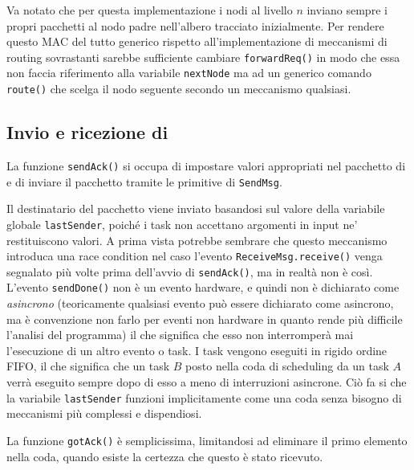 \documentclass[twoside,11pt,a4paper,italian,openany]{book}
\begin{document}
Va notato che per questa implementazione i nodi al livello $n$ inviano sempre i propri 
pacchetti al nodo padre nell'albero tracciato inizialmente. 
Per rendere questo MAC del tutto generico rispetto all'implementazione di meccanismi di 
routing sovrastanti sarebbe sufficiente cambiare \texttt{forwardReq()} in modo che essa 
non faccia riferimento alla variabile  \texttt{nextNode} ma ad un generico comando 
\texttt{route()} che scelga il nodo seguente secondo un meccanismo qualsiasi.  

\subsection{Invio e ricezione di \ack}
La funzione \texttt{sendAck()} si occupa di impostare valori appropriati nel pacchetto di \ack 
e di inviare il pacchetto tramite le primitive di \texttt{SendMsg}. 

Il destinatario del pacchetto \ack viene inviato basandosi sul valore della variabile 
globale \texttt{lastSender}, poiché i task non accettano argomenti in input ne' 
restituiscono valori. 
A prima vista potrebbe sembrare che questo meccanismo introduca una race condition nel 
caso l'evento \texttt{ReceiveMsg.receive()} venga segnalato più volte prima dell'avvio 
di \texttt{sendAck()},
ma in realtà non è così. L'evento \texttt{sendDone()} non è un evento hardware, e quindi non 
è dichiarato come \emph{asincrono} (teoricamente qualsiasi evento può essere dichiarato come asincrono, ma è convenzione non farlo per eventi non hardware in quanto rende più difficile l'analisi del programma) il che significa che esso non interromperà mai l'esecuzione di un altro evento o task. 
I task vengono eseguiti in rigido ordine FIFO, il che significa che un task $B$ posto nella coda
di scheduling da un task $A$ verrà eseguito sempre dopo di esso a meno di interruzioni asincrone.
Ciò fa si che la variabile \texttt{lastSender} funzioni implicitamente come una coda senza 
bisogno di meccanismi più complessi e dispendiosi. 

La funzione \texttt{gotAck()} è semplicissima, limitandosi ad eliminare il primo elemento 
nella coda, quando esiste la certezza che questo è stato ricevuto. 
\end{document}
